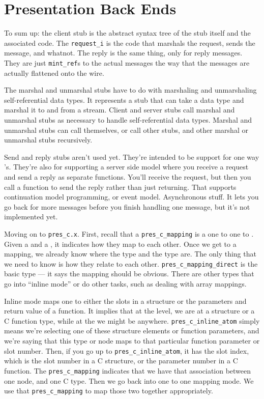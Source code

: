 
\section{Presentation Back Ends}

To sum up: the client stub is the abstract syntax tree of the stub itself and
the associated code.  The \texttt{request\_i} is the code that marshals the
request, sends the \MINT{} message, and whatnot.  The reply is the same thing,
only for reply messages.  They are just \texttt{mint\_ref}s to the actual
messages the way that the messages are actually flattened onto the wire.

The marshal and unmarshal stubs have to do with marshaling and unmarshaling
self-referential data types.  It represents a stub that can take a data type
and marshal it to and from a stream.  Client and server stubs call marshal and
unmarshal stubs as necessary to handle self-referential data types.  Marshal
and unmarshal stubs can call themselves, or call other stubs, and other marshal
or unmarshal stubs recursively.

Send and reply stubs aren't used yet.  They're intended to be support for one
way \RPC{}'s.  They're also for supporting a server side model where you receive a
request and send a reply as separate functions.  You'll receive the request,
but then you call a function to send the reply rather than just returning.
That supports continuation model programming, or event model.  Asynchronous
stuff.  It lets you go back for more messages before you finish handling one
message, but it's not implemented yet.

Moving on to \texttt{pres\_c.x}.  First, recall that a
\texttt{pres\_c\_mapping} is a one to one \MINT{} to \CAST{}\@.  Given a \MINT{} and a
\CAST{}, it indicates how they map to each other.  Once we get to a mapping, we
already know where the \CAST{} type and the \MINT{} type are.  The only thing that we
need to know is how they relate to each other.
\texttt{pres\_c\_mapping\_direct} is the basic type --- it says the mapping
should be obvious.  There are other types that go into ``inline mode'' or do
other tasks, such as dealing with array mappings.

Inline mode maps one \MINT{} to either the slots in a structure or the parameters
and return value of a function.  It implies that at the \CAST{} level, we are at a
structure or a C function type, while at the \MINT{} we might be anywhere.
\texttt{pres\_c\_inline\_atom} simply means we're selecting one of these
structure elements or function parameters, and we're saying that this \MINT{} type
or \MINT{} node maps to that particular function parameter or slot number.  Then,
if you go up to \texttt{pres\_c\_inline\_atom}, it has the slot index, which is
the slot number in a C structure, or the parameter number in a C function.  The
\texttt{pres\_c\_mapping} indicates that we have that association between one
\MINT{} node, and one C type.  Then we go back into one to one mapping mode.  We
use that \texttt{pres\_c\_mapping} to map those two together appropriately.

